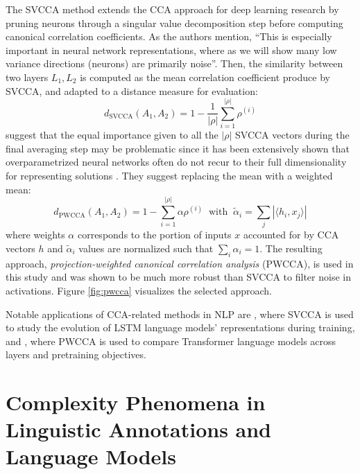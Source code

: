 \documentclass[a4paper, nobind]{templates/ociamthesis}
\begin{document}
The SVCCA method \autocite{guyon-etal-2017-svcca} extends the CCA approach for deep learning research by pruning neurons through a singular value decomposition step before computing canonical correlation coefficients. As the authors mention, ``This is especially important in neural network representations, where as we will show many low variance directions (neurons) are primarily noise''. Then, the similarity between two layers \(L_1, L_2\) is computed as the mean correlation coefficient produce by SVCCA, and adapted to a distance measure for evaluation:
\begin{equation}
d_{\text{SVCCA}}(A_1, A_2) = 1 - \frac{1}{|\rho|} \sum_{i=1}^{|\rho|} \rho^{(i)}
\end{equation}
\textcite{morcos-etal-2018-insights} suggest that the equal importance given to all the \(|\rho|\) SVCCA vectors during the final averaging step may be problematic since it has been extensively shown that overparametrized neural networks often do not recur to their full dimensionality for representing solutions \autocite{frankle-carbin-2018-lottery}. They suggest replacing the mean with a weighted mean:
\begin{equation}
d_{\text{PWCCA}}(A_1, A_2) = 1 - \sum_{i=1}^{|\rho|} \alpha \rho^{(i)} \;\;\text{with} \;\; \tilde \alpha_i = \sum_j |\langle h_i, x_j \rangle|
\end{equation}
where weights \(\alpha\) corresponds to the portion of inputs \(x\) accounted for by CCA vectors \(h\) and \(\tilde \alpha_i\) values are normalized such that \(\sum_i \alpha_i = 1\). The resulting approach, \emph{projection-weighted canonical correlation analysis} (PWCCA), is used in this study and was shown to be much more robust than SVCCA to filter noise in activations. Figure \ref{fig:pwcca} visualizes the selected approach.

Notable applications of CCA-related methods in NLP are \textcite{saphra-lopez-2019-understanding}, where SVCCA is used to study the evolution of LSTM language models' representations during training, and \textcite{voita-etal-2019-bottom}, where PWCCA is used to compare Transformer language models across layers and pretraining objectives.

\titlespacing{\chapter}{0pt}{0pt}{35pt}

\hypertarget{chap:ex1}{%
\chapter{\texorpdfstring{\textbf{Complexity Phenomena in Linguistic Annotations and Language Models}}{Complexity Phenomena in Linguistic Annotations and Language Models}}\label{chap:ex1}}
\end{document}
